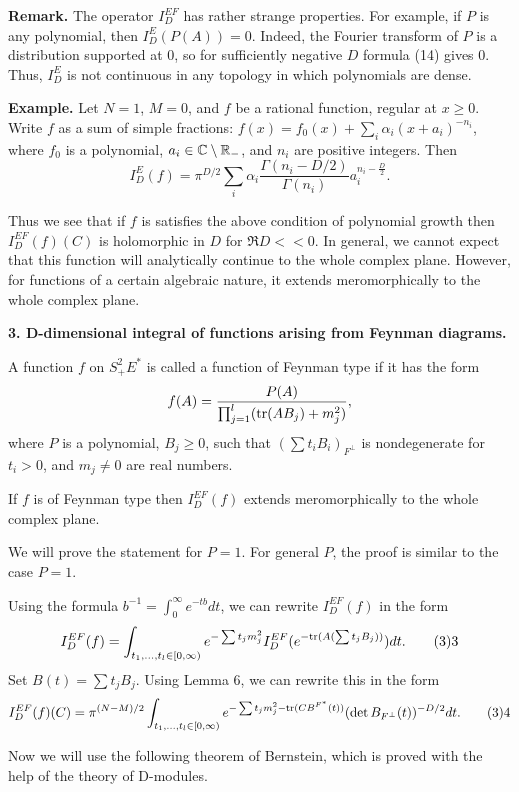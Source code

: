 {\bf Remark.} The operator $I_D^{EF}$ has rather strange properties.
For example, if $P$ is any polynomial, then
$I_D^E(P(A))=0$. Indeed, the Fourier
transform of $P$ is a distribution supported at $0$, 
so for sufficiently negative $D$ formula (14) gives $0$. 
Thus, $I_D^E$ is not continuous in any topology in which polynomials 
are dense. 

{\bf Example.} Let $N=1$, $M=0$, and $f$ be a rational function, regular
at $x\ge 0$. Write $f$ as a sum of simple fractions:
$f(x)=f_0(x)+\sum_i\alpha_i(x+a_i)^{-n_i}$, where 
$f_0$ is a polynomial, $a_i\in\Bbb C\setminus
\Bbb R_-$, and $n_i$ are positive integers.
Then
$$
I_D^E(f)=\pi^{D/2}\sum_i\alpha_i\frac{\Gamma(n_i-D/2)}{\Gamma(n_i)}
a_i^{n_i-\frac{D}{2}}.
$$
 
Thus we see that if $f$ is satisfies the above condition
of polynomial growth then $I_D^{EF}(f)(C)$ is
holomorphic in $D$ for $\Re D<<0$. 
In general, 
we cannot expect that 
this function will analytically continue to the 
whole complex plane. 
However, for functions of a certain algebraic nature, it extends 
meromorphically to the whole complex plane.  

{\bf 3. D-dimensional integral of functions arising from Feynman diagrams.}

 A function $f$ on $S^2_+E^*$ is called a function 
of Feynman type if it has the form
$$
f(A)=\frac{P(A)}{\prod_{j=1}^l({\text{tr}} (AB_j)+m_j^2)}, 
$$
where $P$ is a polynomial, $B_j\ge 0$, 
such that $(\sum t_iB_i)_{F^\perp}$ is nondegenerate 
for $t_i>0$, and $m_j\ne 0$
are real numbers.
\endproclaim

 If $f$ is of Feynman type then 
$I_D^{EF}(f)$ extends meromorphically to the whole complex plane. 
\endproclaim

 We will prove the statement for 
$P=1$. For general $P$, the proof is similar to the case $P=1$. 

Using the formula $b^{-1}=\int_0^\infty e^{-tb}dt$, 
we can rewrite $I_D^{EF}(f)$ in the form
$$
I_D^{EF}(f)=\int_{t_1,...,t_l\in [0,\infty)}
e^{-\sum t_jm_j^2}I_D^{EF}
( e^{-\tr(A(\sum t_jB_j))})dt.\tag 33
$$
Set $B(t)=\sum t_jB_j$. 
Using Lemma 6, we can rewrite this in the form
$$ 
I_D^{EF}(f)(C)=\pi^{(N-M)/2}\int_{t_1,...,t_l\in [0,\infty)}
e^{-\sum t_jm_j^2-\tr(CB^{F^*}(t))}
(\det B_{F^\perp}(t))^{-D/2}dt.\tag 34
$$

Now we will use the following theorem of Bernstein, which is proved
with the help of the theory of D-modules. 

